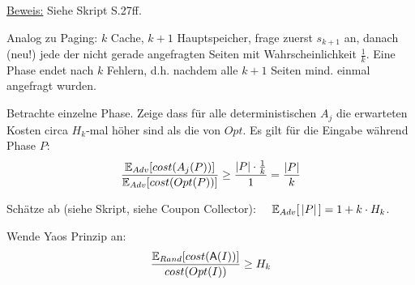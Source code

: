 \underline{Beweis:}
Siehe Skript S.27ff.

Analog zu Paging: $k$ Cache, $k+1$ Hauptspeicher, frage zuerst $s_{k+1}$ an, danach (neu!) jede
der nicht gerade angefragten Seiten mit Wahrscheinlichkeit $\frac{1}{k}$.
Eine Phase endet nach $k$ Fehlern, d.h. nachdem alle $k+1$ Seiten mind. einmal angefragt wurden.

Betrachte einzelne Phase. Zeige dass für alle deterministischen  $A_j$ die erwarteten Kosten circa
\mbox{$H_k$-mal} höher sind als die von $Opt$.
Es gilt für die Eingabe während Phase $P$:
$$ \dfrac{\mathbb{E}_{Adv} [cost(A_j(P))]}{\mathbb{E}_{Adv} [cost(Opt(P))]} \geq \dfrac{|P|\cdot \frac{1}{k}}{1} = \dfrac{|P|}{k} $$

Schätze ab (siehe Skript, siehe Coupon Collector): $\quad \mathbb{E}_{Adv}[\,|P|\,] = 1 + k \cdot H_k$.

Wende Yaos Prinzip an:
$$ \dfrac{\mathbb{E}_{Rand}[cost(\mathsf{A}(I))]}{cost(Opt(I))} \geq H_k $$
